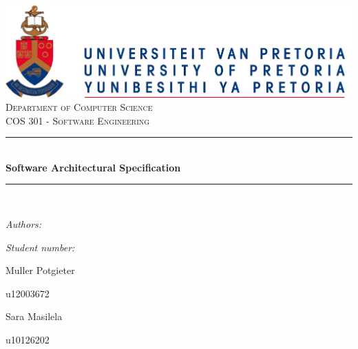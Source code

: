 \documentclass[hidelinks,a4paper,12pt]{article}
\newcommand{\HRule}{\rule{\linewidth}{0.5mm}}
\begin{document}
		\begin{titlepage}
			
			\begin{center}
				\includegraphics[width=1\textwidth]{./Graphs/UPLogo2012.jpg}\\[0.4cm]    
				\textsc{\LARGE Department of Computer Science}\\[1.5cm]
				\textsc{\Large COS 301 - Software Engineering}\\[0.5cm]
				\HRule \\[0.4cm]
				{ \huge \bfseries Software Architectural Specification}\\[0.4cm]
				\HRule \\[0.4cm]
				\begin{minipage}{0.4\textwidth}
					\begin{flushleft} \large
						\emph{Authors:}
					\end{flushleft}
				\end{minipage}
				\begin{minipage}{0.4\textwidth}
					\begin{flushright} \large
						\emph{Student number:}
					\end{flushright}
				\end{minipage}
				
				\begin{minipage}{0.4\textwidth}
					\begin{flushleft} \large
						Muller {Potgieter}
					\end{flushleft}
				\end{minipage}
				\begin{minipage}{0.4\textwidth}
					\begin{flushright} \large
						\emph{}
						u12003672
					\end{flushright}
				\end{minipage}
				
				\begin{minipage}{0.4\textwidth}
					\begin{flushleft} \large
						Sara {Masilela}
					\end{flushleft}
				\end{minipage}
				\begin{minipage}{0.4\textwidth}
					\begin{flushright} \large
						\emph{}
						u10126202
					\end{flushright}
				\end{minipage}
				

\end{center}
\end{titlepage}
\end{document}
